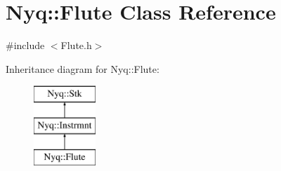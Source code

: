 \hypertarget{class_nyq_1_1_flute}{}\section{Nyq\+:\+:Flute Class Reference}
\label{class_nyq_1_1_flute}


{\ttfamily \#include $<$Flute.\+h$>$}

Inheritance diagram for Nyq\+:\+:Flute\+:\begin{figure}[H]
\begin{center}
\leavevmode
\includegraphics[height=3.000000cm]{class_nyq_1_1_flute}
\end{center}
\end{figure}
